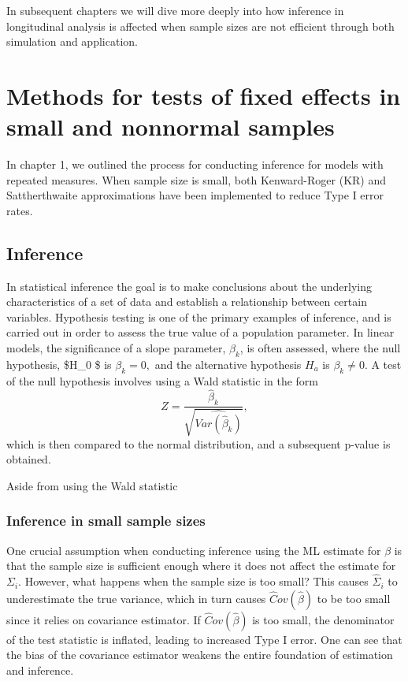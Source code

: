 \documentclass[12pt, twoside]{amherstthesis}
\begin{document}
In subsequent chapters we will dive more deeply into how inference in longitudinal analysis is affected when sample sizes are not efficient through both simulation and application.

\hypertarget{rmd-basics}{%
\chapter{Methods for tests of fixed effects in small and nonnormal samples}\label{rmd-basics}}

In chapter 1, we outlined the process for conducting inference for models with repeated measures. When sample size is small, both Kenward-Roger (KR) and Sattherthwaite approximations have been implemented to reduce Type I error rates.

\hypertarget{inference}{%
\section{Inference}\label{inference}}

In statistical inference the goal is to make conclusions about the underlying characteristics of a set of data and establish a relationship between certain variables. Hypothesis testing is one of the primary examples of inference, and is carried out in order to assess the true value of a population parameter. In linear models, the significance of a slope parameter, \(\beta_k\), is often assessed, where the null hypothesis, \$H\_0 \$ is \(\beta_k = 0,\) and the alternative hypothesis \(H_a\) is \(\beta_k \neq 0.\) A test of the null hypothesis involves using a Wald statistic in the form \[ Z = \frac{\hat\beta_k}{\sqrt{\hat{Var(\hat\beta_k)}}},\] which is then compared to the normal distribution, and a subsequent p-value is obtained.

Aside from using the Wald statistic

\hypertarget{inference-in-small-sample-sizes}{%
\subsection{Inference in small sample sizes}\label{inference-in-small-sample-sizes}}

One crucial assumption when conducting inference using the ML estimate for \(\beta\) is that the sample size is sufficient enough where it does not affect the estimate for \(\Sigma_i.\) However, what happens when the sample size is too small? This causes \(\hat\Sigma_i\) to underestimate the true variance, which in turn causes \(\hat Cov(\hat\beta)\) to be too small since it relies on covariance estimator. If \(\hat Cov(\hat\beta)\) is too small, the denominator of the test statistic is inflated, leading to increased Type I error. One can see that the bias of the covariance estimator weakens the entire foundation of estimation and inference.
\end{document}
